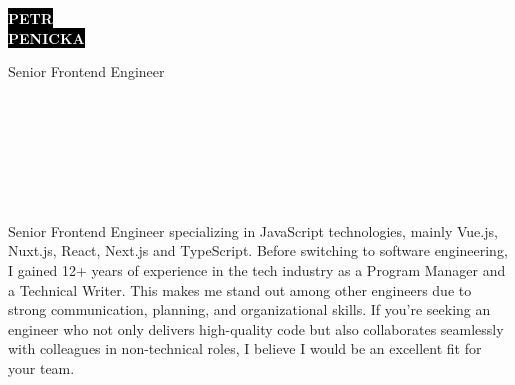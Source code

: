 \documentclass[9pt]{developercv}
\begin{document}
\begin{minipage}[t]{0.41\textwidth}
  \vspace{-\baselineskip}

  \colorbox{black}{{\HUGE\textcolor{white}{\textbf{\MakeUppercase{Petr}}}}}
  \\
  \colorbox{black}{{\HUGE\textcolor{white}{\textbf{\MakeUppercase{Penicka}}}}}

  \vspace{6pt}

  {\huge Senior Frontend Engineer}
\end{minipage}
\begin{minipage}[t]{0.275\textwidth}
  \vspace{-\baselineskip}

  \\
  \\
  \\
\end{minipage}
\begin{minipage}[t]{0.34\textwidth}
  \vspace{-\baselineskip}

  \\
  \\

\end{minipage}

\vspace{0.5cm}


\begin{minipage}[t]{1\textwidth}
  \vspace{-\baselineskip}

  {Senior Frontend Engineer specializing in JavaScript technologies, mainly Vue.js, Nuxt.js, React, Next.js and TypeScript. Before switching to software engineering, I gained 12+ years of experience in the tech industry as a Program Manager and a Technical Writer. This makes me stand out among other engineers due to strong communication, planning, and organizational skills. If you’re seeking an engineer who not only delivers high-quality code but also collaborates seamlessly with colleagues in non-technical roles, I believe I would be an excellent fit for your team.}\\
\end{minipage}
\end{document}
